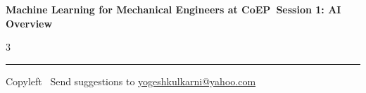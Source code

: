 \documentclass[8pt,landscape]{article}
\begin{document}
\footnotesize

\begin{center}
\Large{\textbf{Machine Learning for Mechanical Engineers at CoEP\ Session 1: AI Overview}}
\end{center}

\begin{multicols}{3}

\end{multicols}

\rule{\linewidth}{0.25pt}
\scriptsize
Copyleft \textcopyleft\  Send suggestions to
\href{http://www.yogeshkulkarni.com}{yogeshkulkarni@yahoo.com}
\end{document}
